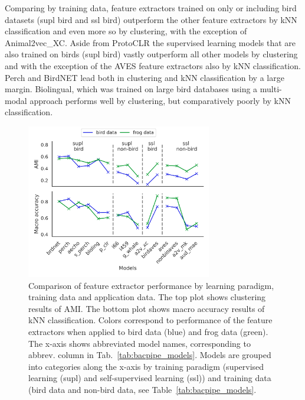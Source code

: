 Comparing by training data, feature extractors trained on only or including bird datasets (supl bird and ssl bird) outperform the other feature extractors by kNN classification and even more so by clustering, with the exception of Animal2vec\_XC.
Aside from ProtoCLR the supervised learning models that are also trained on birds (supl bird) vastly outperform all other models by clustering and with the exception of the AVES feature extractors also by kNN classification.
Perch and BirdNET lead both in clustering and kNN classification by a large margin.
Biolingual, which was trained on large bird databases using a multi-modal approach performs well by clustering, but comparatively poorly by kNN classification.

\begin{figure}[ht]
    \centerline{{
    \includegraphics[width=8.1cm]{Sections/imgs/clust_and_class_lineplots.png}}}
    \caption{Comparison of feature extractor performance by learning paradigm, training data and application data. 
    The top plot shows clustering results of AMI.
    The bottom plot shows macro accuracy results of kNN classification. 
    Colors correspond to performance of the feature extractors when applied to bird data (blue) and frog data (green).
    The x-axis shows abbreviated model names, corresponding to abbrev. column in Tab.~\ref{tab:bacpipe_models}. 
    Models are grouped into categories along the x-axis by training paradigm (supervised learning (supl) and self-supervised learning (ssl)) and training data (bird data and non-bird data, see Table~\ref{tab:bacpipe_models}.}
    \label{fig:orig_vs_ump}
\end{figure}

